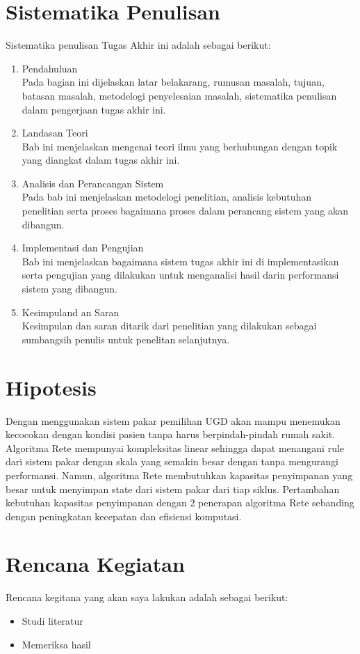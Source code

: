 \section{Sistematika Penulisan}
Sistematika penulisan Tugas Akhir ini adalah sebagai berikut:
\begin{enumerate}
	\item Pendahuluan\\
	Pada bagian ini dijelaskan latar belakarang, rumusan masalah, tujuan, batasan masalah, metodelogi penyelesaian masalah, sistematika penulisan dalam pengerjaan tugas akhir ini.
	\item Landasan Teori\\
	Bab ini menjelaskan mengenai teori ilmu yang berhubungan dengan topik yang diangkat dalam tugas akhir ini.
	\item Analisis dan Perancangan Sistem\\
	Pada bab ini menjelaskan metodelogi penelitian, analisis kebutuhan penelitian serta proses bagaimana proses dalam perancang sistem yang akan dibangun.
	\item Implementasi dan Pengujian \\
	Bab ini menjelaskan bagaimana sistem tugas akhir ini di implementasikan serta pengujian yang dilakukan untuk menganalisi hasil darin performansi sistem yang dibangun.
	\item Kesimpuland an Saran\\
	Kesimpulan dan saran ditarik dari penelitian yang dilakukan sebagai sumbangsih penulis untuk penelitan selanjutnya.
\end{enumerate}

\section{Hipotesis}
Dengan menggunakan sistem pakar pemilihan UGD akan mampu menemukan kecocokan dengan kondisi pasien tanpa harus berpindah-pindah rumah sakit. Algoritma Rete mempunyai kompleksitas linear sehingga dapat menangani rule dari sistem pakar dengan skala yang semakin besar dengan tanpa mengurangi performansi. Namun, algoritma Rete membutuhkan kapasitas penyimpanan yang besar untuk menyimpan state dari sistem pakar dari tiap siklus. Pertambahan kebutuhan kapasitas penyimpanan dengan 2
penerapan algoritma Rete sebanding dengan peningkatan kecepatan dan efisiensi komputasi.
\iflogTA
\else
\section{Rencana Kegiatan}
Rencana kegitana yang akan saya lakukan adalah sebagai berikut:
\begin{itemize}
    \item Studi literatur
    \item Memeriksa hasil
\end{itemize}

